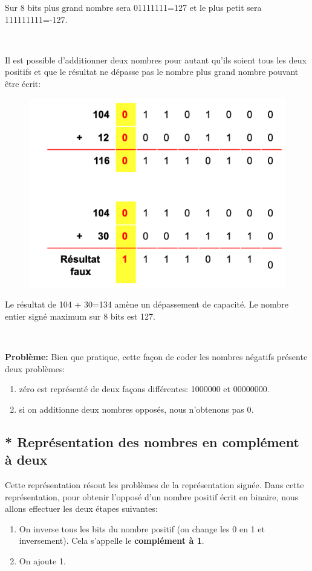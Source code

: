 \documentclass[11pt, a4paper]{book}
\begin{document}
Sur 8 bits plus grand nombre sera 01111111=127 et le plus petit sera 111111111=-127.

\ 

Il est possible d'additionner deux nombres pour autant qu'ils soient tous les deux positifs et que le résultat ne dépasse pas le nombre plus grand nombre pouvant être écrit:

\begin{figure}[h]
\begin{center}
\includegraphics[scale=.5]{images/Operationsigne}
\end{center}
\end{figure}

Le résultat de 104 + 30=134 amène un dépassement de capacité. Le nombre entier signé maximum sur 8 bits est 127.


\ 

{\bf Problème:} Bien que pratique, cette façon de coder les nombres négatifs présente deux problèmes:
\begin{enumerate}
\item zéro est représenté de deux façons différentes: 1000000 et 00000000.
\item si on additionne deux nombres opposés, nous n'obtenons pas 0. 
\end{enumerate}

\subsection{* Représentation des nombres en complément à deux}

Cette représentation résout les problèmes de la représentation signée. Dans cette représentation, pour obtenir l'opposé d'un nombre positif écrit en binaire, nous allons effectuer les deux étapes suivantes:
\begin{enumerate}
 \item On inverse tous les bits du nombre positif (on change les 0 en 1 et inversement). Cela s'appelle le {\bf complément à 1}.
 \item On ajoute 1.
\end{enumerate}
\end{document}
